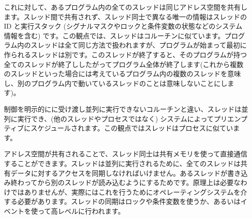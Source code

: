 これに対して、あるプログラム内の全てのスレッドは同じアドレス空間を共有します。スレッド間で共有されず、スレッド同士で異なる唯一の情報はスレッドの ID と実行スタック (シグナルマスクやロックと条件変数の状態などのシステム情報を含む) です。この観点では、スレッドはコルーチンに似ています。プログラム内のスレッドは全て同じ方法で扱われますが、プログラムが始まって最初に作られるスレッドは別です。このスレッドが終了すると、そのプログラムが持つ全てのスレッドが終了ししたがってプログラム全体が終了します(これから複数のスレッドといった場合には考えているプログラム内の複数のスレッドを意味し、別のプログラム内で動いているスレッドのことは意味しないことにします)。

制御を明示的にに受け渡し並列に実行できないコルーチンと違い、スレッドは並列に実行でき、(他のスレッドやプロセスではなく) システムによってプリエンプティブにスケジュールされます。この観点ではスレッドはプロセスに似ています。

アドレス空間が共有されることで、スレッド同士は共有メモリを使って直接通信することができます。スレッドは並列に実行されるために、全てのスレッドは共有データに対するアクセスを同期しなければいけません。あるスレッドが書き込み終わってから別のスレッドが読み込むようにするためです。原理上は必要なわけではありませんが、実際にはこれを行うためにオペレーティングシステムを介する必要があります。スレッドの同期はロックや条件変数を使うか、あるいはイベントを使って高レベルに行われます。

